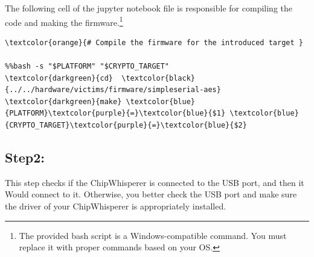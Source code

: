 \documentclass[11pt]{article}
\begin{document}
\noindent The following cell of the jupyter notebook file is responsible for compiling the code and making the firmware.\footnote{The provided bash script is a Windows-compatible command. You must replace it with proper commands based on your OS.}\\


\begin{small} 
\begin{tcolorbox}
\begin{Verbatim}[commandchars=\\\{\}]
\textcolor{orange}{# Compile the firmware for the introduced target }

%%bash -s "$PLATFORM" "$CRYPTO_TARGET" 
\textcolor{darkgreen}{cd}  \textcolor{black}{../../hardware/victims/firmware/simpleserial-aes}
\textcolor{darkgreen}{make} \textcolor{blue}{PLATFORM}\textcolor{purple}{=}\textcolor{blue}{$1} \textcolor{blue}{CRYPTO_TARGET}\textcolor{purple}{=}\textcolor{blue}{$2}
\end{Verbatim}
\end{tcolorbox}
\end{small} 


\subsection{Step2:}
This step checks if the ChipWhisperer is connected to the USB port, and then it Would connect to it. Otherwise, you better check the USB port and make sure the driver of your ChipWhisperer is appropriately installed.  
\end{document}
